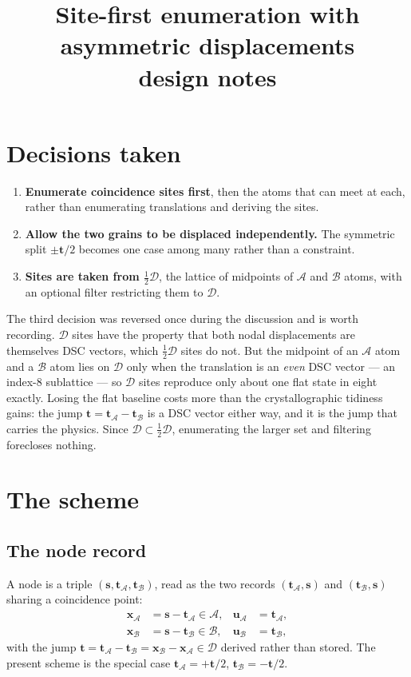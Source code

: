 \documentclass[11pt]{article}
\title{Site-first enumeration with asymmetric displacements\\
       \large design notes}
\date{}
\newcommand{\A}{\mathcal{A}}
\newcommand{\B}{\mathcal{B}}
\newcommand{\D}{\mathcal{D}}
\begin{document}
\maketitle

\section*{Decisions taken}

\begin{enumerate}
  \item \textbf{Enumerate coincidence sites first}, then the atoms that can meet
        at each, rather than enumerating translations and deriving the sites.
  \item \textbf{Allow the two grains to be displaced independently.} The
        symmetric split $\pm\mathbf{t}/2$ becomes one case among many rather
        than a constraint.
  \item \textbf{Sites are taken from $\tfrac{1}{2}\D$}, the lattice of midpoints
        of $\A$ and $\B$ atoms, with an optional filter restricting them to
        $\D$.
\end{enumerate}

The third decision was reversed once during the discussion and is worth
recording. $\D$ sites have the property that both nodal displacements are
themselves DSC vectors, which $\tfrac{1}{2}\D$ sites do not. But the midpoint of
an $\A$ atom and a $\B$ atom lies on $\D$ only when the translation is an
\emph{even} DSC vector --- an index-8 sublattice --- so $\D$ sites reproduce
only about one flat state in eight exactly. Losing the flat baseline costs more
than the crystallographic tidiness gains: the jump
$\mathbf{t} = \mathbf{t}_\A - \mathbf{t}_\B$ is a DSC vector either way, and it
is the jump that carries the physics. Since $\D \subset \tfrac{1}{2}\D$,
enumerating the larger set and filtering forecloses nothing.

\section*{The scheme}

\subsection*{The node record}

A node is a triple $(\mathbf{s}, \mathbf{t}_\A, \mathbf{t}_\B)$, read as the two
records $(\mathbf{t}_\A, \mathbf{s})$ and $(\mathbf{t}_\B, \mathbf{s})$ sharing a
coincidence point:
\begin{align*}
  \mathbf{x}_\A &= \mathbf{s} - \mathbf{t}_\A \in \A,
  &\mathbf{u}_\A &= \mathbf{t}_\A, \\
  \mathbf{x}_\B &= \mathbf{s} - \mathbf{t}_\B \in \B,
  &\mathbf{u}_\B &= \mathbf{t}_\B,
\end{align*}
with the jump $\mathbf{t} = \mathbf{t}_\A - \mathbf{t}_\B
= \mathbf{x}_\B - \mathbf{x}_\A \in \D$ derived rather than stored. The present
scheme is the special case $\mathbf{t}_\A = +\mathbf{t}/2$,
$\mathbf{t}_\B = -\mathbf{t}/2$.
\end{document}
